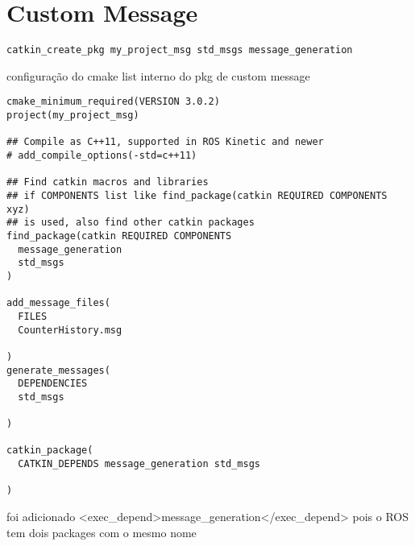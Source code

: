 \documentclass[letterpaper]{article}
\begin{document}
\section{Custom Message}
\begin{lstlisting}[style=bashStyle, title=comando do terminal para o pacote de std msg]
catkin_create_pkg my_project_msg std_msgs message_generation
\end{lstlisting}
configuração do cmake list interno do pkg de custom message
\begin{lstlisting}[style=xmlstyle, title=my\_project\_msg/CMakeLists.txt] 
cmake_minimum_required(VERSION 3.0.2)
project(my_project_msg)

## Compile as C++11, supported in ROS Kinetic and newer
# add_compile_options(-std=c++11)

## Find catkin macros and libraries
## if COMPONENTS list like find_package(catkin REQUIRED COMPONENTS xyz)
## is used, also find other catkin packages
find_package(catkin REQUIRED COMPONENTS
  message_generation
  std_msgs
)

add_message_files(
  FILES
  CounterHistory.msg

)
generate_messages(
  DEPENDENCIES
  std_msgs

)

catkin_package(
  CATKIN_DEPENDS message_generation std_msgs

)
\end{lstlisting}
foi adicionado <exec\_depend>message\_generation</exec\_depend> pois o ROS tem dois packages com o mesmo nome
\end{document}

